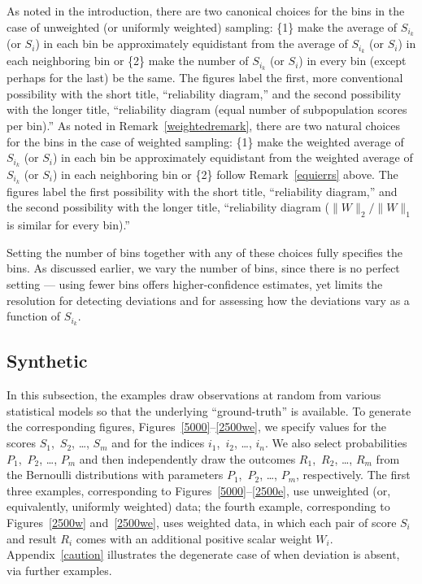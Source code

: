 \documentclass{article}
\begin{document}
As noted in the introduction, there are two canonical choices for the bins
in the case of unweighted (or uniformly weighted) sampling:
\{1\} make the average of $S_{i_k}$ (or $S_i$) in each bin
be approximately equidistant from the average of $S_{i_k}$ (or $S_i$)
in each neighboring bin or
\{2\} make the number of $S_{i_k}$ (or $S_i$) in every bin
(except perhaps for the last) be the same.
The figures label the first, more conventional possibility
with the short title, ``reliability diagram,'' and the second possibility
with the longer title,
``reliability diagram (equal number of subpopulation scores per bin).''
As noted in Remark~\ref{weightedremark}, there are two natural choices
for the bins in the case of weighted sampling:
\{1\} make the weighted average of $S_{i_k}$ (or $S_i$) in each bin
be approximately equidistant from the weighted average of $S_{i_k}$ (or $S_i$)
in each neighboring bin or
\{2\} follow Remark~\ref{equierrs} above.
The figures label the first possibility with the short title,
``reliability diagram,'' and the second possibility
with the longer title,
``reliability diagram ($\|W\|_2/\|W\|_1$ is similar for every bin).''

Setting the number of bins together with any of these choices
fully specifies the bins. As discussed earlier, we vary the number of bins,
since there is no perfect setting --- using fewer bins offers higher-confidence
estimates, yet limits the resolution for detecting deviations
and for assessing how the deviations vary as a function of $S_{i_k}$.


\subsection{Synthetic}
\label{synthetic}

In this subsection, the examples draw observations at random
from various statistical models so that the underlying ``ground-truth''
is available. To generate the corresponding figures,
Figures~\ref{5000}--\ref{2500we}, we specify values for the scores
$S_1$,~$S_2$, \dots, $S_m$ and for the indices $i_1$,~$i_2$, \dots, $i_n$.
We also select probabilities $P_1$,~$P_2$, \dots, $P_m$
and then independently draw the outcomes $R_1$,~$R_2$, \dots, $R_m$
from the Bernoulli distributions with parameters $P_1$,~$P_2$, \dots, $P_m$,
respectively. The first three examples,
corresponding to Figures~\ref{5000}--\ref{2500e}, use unweighted
(or, equivalently, uniformly weighted) data;
the fourth example, corresponding to Figures~\ref{2500w} and~\ref{2500we},
uses weighted data, in which each pair of score $S_i$ and result $R_i$ comes
with an additional positive scalar weight $W_i$.
Appendix~\ref{caution} illustrates the degenerate case of when deviation
is absent, via further examples.
\end{document}
